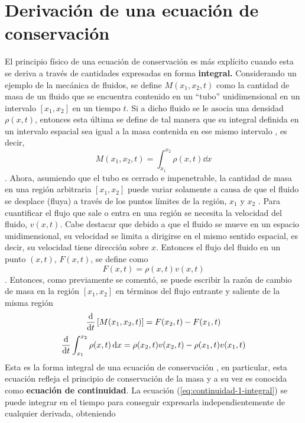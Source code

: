 \section{Derivación de una ecuación de conservación}
El principio físico de una ecuación de conservación es más explícito cuando esta se deriva a través de cantidades expresadas en forma \textbf{integral.} Considerando un ejemplo de la mecánica de fluidos, se define $M(x_1,x_2,t)$ como la cantidad de masa de un fluido que se encuentra contenido en un ``tubo'' unidimensional en un intervalo  $[x_1,x_2]$ en un tiempo $t$. Si a dicho fluido se le asocia una densidad $\rho(x,t)$, entonces esta última se define de tal manera que su integral definida en un intervalo espacial sea igual a la masa contenida en ese mismo intervalo \cite{Leveque}, es decir,
\begin{equation}
	M(x_1, x_2, t) = \int_{x_1}^{x_2}\rho(x,t)\dd{x}
\end{equation}.
Ahora, asumiendo que el tubo es cerrado e impenetrable, la cantidad de masa en una región arbitraria $[x_1,x_2]$ puede variar solamente a causa de que el fluido se desplace (fluya) a través de los puntos límites de la región, $x_1$ y $x_2$ \cite{Leveque}. Para cuantificar el flujo que sale o entra en una región se necesita la velocidad del fluido, $v(x,t)$. Cabe destacar que debido a que el fluido se mueve en un espacio unidimensional, su velocidad se limita a dirigirse en el mismo sentido espacial, es decir, su velocidad tiene dirección sobre $x$. Entonces el flujo del fluido en un punto $(x,t)$, $F(x,t)$, se define como 
\begin{equation}
	F(x,t) = \rho(x,t)v(x,t)
\end{equation}\cite{Leveque}.
Entonces, como previamente se comentó, se puede escribir la razón de cambio de masa en la región $[x_1,x_2]$ en términos del flujo entrante y saliente de la misma región
\begin{equation}
	\dv{t}	\left[M(x_1, x_2, t)\right] = F(x_2,t) - F(x_1,t)
\end{equation}
\begin{equation}
	\dv{t}	\int_{x_1}^{x_2}\rho(x,t)\dd{x} = \rho(x_2,t)v(x_2,t) - \rho(x_1,t)v(x_1,t)
	\label{eq:continuidad-1-integral}
\end{equation}
Esta es la forma integral de una ecuación de conservación \cite{Leveque}, en particular, esta ecuación refleja el principio de conservación de la masa y a su vez es conocida como \textbf{ecuación de continuidad}. La ecuación (\ref{eq:continuidad-1-integral}) se puede integrar en el tiempo para conseguir expresarla independientemente de cualquier derivada, obteniendo
